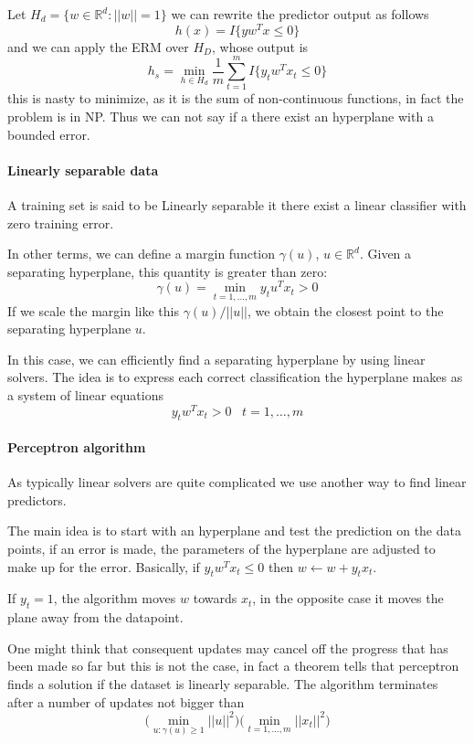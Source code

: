 Let $H_d = \{ w \in \mathbb{R}^d : ||w|| = 1\}$ we can rewrite the predictor 
output as follows 
$$h(x) = I\{ yw^Tx \leq 0\}$$
and we can apply the ERM over $H_D$, whose output is 
$$h_s = \min_{h \in H_d} \frac{1}{m} \sum_{t=1}^m I\{ y_tw^Tx_t \leq 0\}$$
this is nasty to minimize, as it is the sum of non-continuous functions, 
in fact the problem is in NP. Thus we can not say if a there exist an 
hyperplane with a bounded error.

\paragraph{Linearly separable data}
A training set is said to be Linearly separable it there exist a 
linear classifier with zero training error. 

In other terms, we can define a margin function $\gamma(u)$, $u \in \mathbb{R}^d$. Given a separating hyperplane, 
this quantity is greater than zero:
$$\gamma(u) = \min_{t=1, \dots, m} y_t u ^T x_t > 0$$
If we scale the margin like this $\gamma(u)/||u||$, we obtain the closest point to the separating hyperplane 
$u$.

In this case, we can efficiently find a separating hyperplane by using 
linear solvers. The idea is to express each correct classification 
the hyperplane makes as a system of linear equations 
$$y_tw^Tx_t > 0 \;\;\; t=1, \dots, m$$

\paragraph{Perceptron algorithm}
As typically linear solvers are quite complicated we use another 
way to find linear predictors.

The main idea is to start with an hyperplane and test the prediction on the 
data points, if an error is made, the parameters of the hyperplane are adjusted to make up for
the error. Basically, if $y_tw^Tx_t \leq 0$ then $w \gets w + y_tx_t$.

If $y_t = 1$, the algorithm moves $w$ towards $x_t$, in the opposite case 
it moves the plane away from the datapoint.

One might think that consequent updates may cancel off the progress 
that has been made so far but this is not the case, in fact a theorem tells 
that perceptron finds a solution if the dataset is linearly separable.
The algorithm terminates after a number of updates not bigger than 
$$\bigg( \min_{u: \gamma(u) \geq 1} ||u||^2\bigg) 
\bigg( \min_{t = 1, \dots, m} ||x_t||^2\bigg)$$

